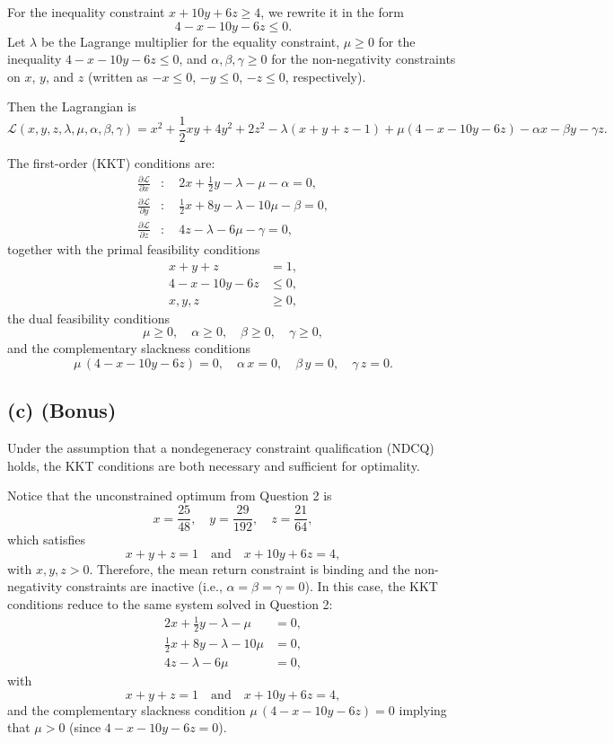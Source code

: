 \documentclass{article}
\begin{document}
For the inequality constraint \(x+10y+6z\ge 4\), we rewrite it in the form
\[
4-x-10y-6z\le 0.
\]
Let \(\lambda\) be the Lagrange multiplier for the equality constraint, \(\mu\ge 0\) for the inequality \(4-x-10y-6z\le 0\), and \(\alpha,\beta,\gamma\ge 0\) for the non-negativity constraints on \(x\), \(y\), and \(z\) (written as \(-x\le 0\), \(-y\le 0\), \(-z\le 0\), respectively).

Then the Lagrangian is
\[
\mathcal{L}(x,y,z,\lambda,\mu,\alpha,\beta,\gamma)=x^2+\frac{1}{2}xy+4y^2+2z^2-\lambda(x+y+z-1)+\mu(4-x-10y-6z)-\alpha x-\beta y-\gamma z.
\]

The first-order (KKT) conditions are:
\[
\begin{aligned}
\frac{\partial\mathcal{L}}{\partial x}&: \quad 2x+\frac{1}{2}y-\lambda-\mu-\alpha=0,\\[1mm]
\frac{\partial\mathcal{L}}{\partial y}&: \quad \frac{1}{2}x+8y-\lambda-10\mu-\beta=0,\\[1mm]
\frac{\partial\mathcal{L}}{\partial z}&: \quad 4z-\lambda-6\mu-\gamma=0,
\end{aligned}
\]
together with the primal feasibility conditions
\[
\begin{aligned}
x+y+z&=1,\\[1mm]
4-x-10y-6z&\le 0,\\[1mm]
x,y,z&\ge 0,
\end{aligned}
\]
the dual feasibility conditions
\[
\mu\ge 0,\quad \alpha\ge 0,\quad \beta\ge 0,\quad \gamma\ge 0,
\]
and the complementary slackness conditions
\[
\mu\,(4-x-10y-6z)=0,\quad \alpha\,x=0,\quad \beta\,y=0,\quad \gamma\,z=0.
\]

\subsection*{(c) (Bonus)}
Under the assumption that a nondegeneracy constraint qualification (NDCQ) holds, the KKT conditions are both necessary and sufficient for optimality.

Notice that the unconstrained optimum from Question 2 is
\[
x=\frac{25}{48},\quad y=\frac{29}{192},\quad z=\frac{21}{64},
\]
which satisfies
\[
x+y+z=1\quad \text{and} \quad x+10y+6z=4,
\]
with \(x,y,z>0\). Therefore, the mean return constraint is binding and the non-negativity constraints are inactive (i.e., \(\alpha=\beta=\gamma=0\)). In this case, the KKT conditions reduce to the same system solved in Question 2:
\[
\begin{aligned}
2x+\frac{1}{2}y-\lambda-\mu&=0,\\[1mm]
\frac{1}{2}x+8y-\lambda-10\mu&=0,\\[1mm]
4z-\lambda-6\mu&=0,
\end{aligned}
\]
with
\[
x+y+z=1\quad \text{and} \quad x+10y+6z=4,
\]
and the complementary slackness condition \(\mu\,(4-x-10y-6z)=0\) implying that \(\mu>0\) (since \(4-x-10y-6z=0\)).
\end{document}
